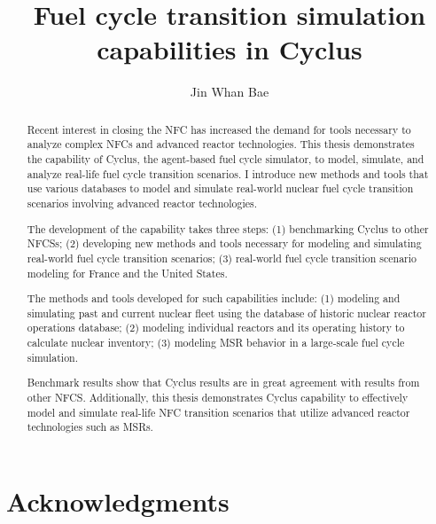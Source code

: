 \documentclass{report}
\begin{document}
\title{Fuel cycle transition simulation capabilities in Cyclus}
\author{Jin Whan Bae}
\maketitle


\begin{abstract}
Recent interest in closing the \gls{NFC} has increased the demand for tools necessary
to analyze complex \glspl{NFC} and advanced reactor technologies. 
This thesis demonstrates the capability of Cyclus, the 
agent-based fuel cycle simulator, to model, simulate, and analyze
real-life fuel cycle transition scenarios. I introduce new methods
and tools that use various databases to model and simulate real-world
nuclear fuel cycle transition scenarios involving advanced reactor
technologies.

The development of the capability takes
three steps: (1) benchmarking
Cyclus to other \glspl{NFCS};
(2) developing new methods and tools necessary for modeling and simulating
real-world fuel cycle transition scenarios; (3) real-world
fuel cycle transition scenario modeling for France and the United States.

The methods and tools developed for such capabilities include:
(1) modeling and simulating past and current
nuclear fleet using the database of historic nuclear reactor operations
database; (2) modeling individual reactors and its operating history
to calculate nuclear inventory; (3) modeling \gls{MSR} behavior
in a large-scale fuel cycle simulation.

Benchmark results show that Cyclus results are in great agreement
with results from other \gls{NFCS}.
Additionally, this thesis demonstrates Cyclus capability to effectively
model and simulate real-life \gls{NFC} transition scenarios
that utilize advanced reactor technologies such as \glspl{MSR}.

\end{abstract}

\chapter*{Acknowledgments}
\end{document}
